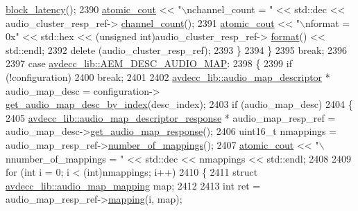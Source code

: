 \begin{DoxyCode}
      \hyperlink{classavdecc__lib_1_1audio__cluster__descriptor__response_af1eddc3de0237a6db00b74603eba47c6}{block\_latency}();
2390             \hyperlink{cmd__line_8h_a0bc38ccc65c79ba06c6fcd7b4bf554c3}{atomic\_cout} << \textcolor{stringliteral}{"\(\backslash\)nchannel\_count = "} << std::dec << audio\_cluster\_resp\_ref->
      \hyperlink{classavdecc__lib_1_1audio__cluster__descriptor__response_a6912bbd2c6ecaf359466e8251cc1d5ee}{channel\_count}();
2391             \hyperlink{cmd__line_8h_a0bc38ccc65c79ba06c6fcd7b4bf554c3}{atomic\_cout} << \textcolor{stringliteral}{"\(\backslash\)nformat = 0x"} << std::hex << (\textcolor{keywordtype}{unsigned} int)audio\_cluster\_resp\_ref->
      \hyperlink{classavdecc__lib_1_1audio__cluster__descriptor__response_a66b64a7a47345255bf3f7ecd09d9caa4}{format}() << std::endl;
2392             \textcolor{keyword}{delete} (audio\_cluster\_resp\_ref);
2393         \}
2394     \}
2395     \textcolor{keywordflow}{break};
2396 
2397     \textcolor{keywordflow}{case} \hyperlink{namespaceavdecc__lib_ac7b7d227e46bc72b63ee9e9aae15902fab7cc7534edb71a30193e3c41bf920cf5}{avdecc\_lib::AEM\_DESC\_AUDIO\_MAP}:
2398     \{
2399         \textcolor{keywordflow}{if} (!configuration)
2400             \textcolor{keywordflow}{break};
2401 
2402         \hyperlink{classavdecc__lib_1_1audio__map__descriptor}{avdecc\_lib::audio\_map\_descriptor} * audio\_map\_desc = configuration->
      \hyperlink{classavdecc__lib_1_1configuration__descriptor_a2d946ae36e146b7a1bbe30e31017f20f}{get\_audio\_map\_desc\_by\_index}(desc\_index);
2403         \textcolor{keywordflow}{if} (audio\_map\_desc)
2404         \{
2405             \hyperlink{classavdecc__lib_1_1audio__map__descriptor__response}{avdecc\_lib::audio\_map\_descriptor\_response} * 
      audio\_map\_resp\_ref = audio\_map\_desc->\hyperlink{classavdecc__lib_1_1audio__map__descriptor_ac333ca48d369f97aac9172267b5c5a61}{get\_audio\_map\_response}();
2406             uint16\_t nmappings = audio\_map\_resp\_ref->\hyperlink{classavdecc__lib_1_1audio__map__descriptor__response_afdd7d97f9329c6f6bb9646e6ac090c55}{number\_of\_mappings}();
2407             \hyperlink{cmd__line_8h_a0bc38ccc65c79ba06c6fcd7b4bf554c3}{atomic\_cout} << \textcolor{stringliteral}{"\(\backslash\)nnumber\_of\_mappings = "} << std::dec << nmappings << std::endl;
2408 
2409             \textcolor{keywordflow}{for} (\textcolor{keywordtype}{int} i = 0; i < (int)nmappings; i++)
2410             \{
2411                 \textcolor{keyword}{struct }\hyperlink{structavdecc__lib_1_1audio__map__mapping}{avdecc\_lib::audio\_map\_mapping} map;
2412 
2413                 \textcolor{keywordtype}{int} ret = audio\_map\_resp\_ref->\hyperlink{classavdecc__lib_1_1audio__map__descriptor__response_a5f6a0ccf54636fda2d718efab6b4abae}{mapping}(i, map);

\end{DoxyCode}
